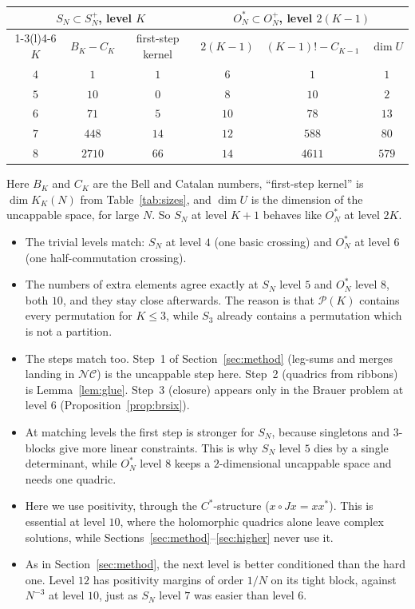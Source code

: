 \documentclass[11pt]{amsart}
\theoremstyle{definition}
\theoremstyle{remark}
\theoremstyle{plain}
\numberwithin{equation}{section}
\numberwithin{table}{section}
\begin{document}
\begin{center}
\begin{tabular}{@{}cccccc@{}}
\toprule
\multicolumn{3}{c}{$S_N\subset S_N^+$, level $K$} & \multicolumn{3}{c}{$O_N^*\subset O_N^+$, level $2(K-1)$}\\
\cmidrule(r){1-3}\cmidrule(l){4-6}
$K$ & $B_K-C_K$ & first-step kernel & $2(K-1)$ & $(K-1)!-C_{K-1}$ & $\dim U$ \\
\midrule
$4$ & $1$ & $1$ & $6$ & $1$ & $1$ \\
$5$ & $10$ & $0$ & $8$ & $10$ & $2$ \\
$6$ & $71$ & $5$ & $10$ & $78$ & $13$ \\
$7$ & $448$ & $14$ & $12$ & $588$ & $80$ \\
$8$ & $2710$ & $66$ & $14$ & $4611$ & $579$ \\
\bottomrule
\end{tabular}
\end{center}

Here $B_K$ and $C_K$ are the Bell and Catalan numbers, ``first-step kernel'' is $\dim K_K(N)$ from Table~\ref{tab:sizes}, and
$\dim U$ is the dimension of the uncappable space, for large $N$. So $S_N$ at level $K+1$ behaves like $O_N^*$ at level
$2K$.
\begin{itemize}
\item The trivial levels match: $S_N$ at level $4$ (one basic crossing) and $O_N^*$ at level $6$ (one half-commutation
crossing).
\item The numbers of extra elements agree exactly at $S_N$ level $5$ and $O_N^*$ level $8$, both $10$, and they stay close
afterwards. The reason is that $\mathcal P(K)$ contains every permutation for $K\le3$, while $S_3$ already contains a
permutation which is not a partition.
\item The steps match too. Step~1 of Section~\ref{sec:method} (leg-sums and merges landing in $\mathcal{NC}$) is the uncappable step
here. Step~2 (quadrics from ribbons) is Lemma~\ref{lem:glue}. Step~3 (closure) appears only in the Brauer problem at
level $6$ (Proposition~\ref{prop:brsix}).
\item At matching levels the first step is stronger for $S_N$, because singletons and $3$-blocks give more linear
constraints. This is why $S_N$ level $5$ dies by a single determinant, while $O_N^*$ level $8$ keeps a $2$-dimensional
uncappable space and needs one quadric.
\item Here we use positivity, through the $C^*$-structure ($x\circ Jx=xx^*$). This is essential at level $10$, where the
holomorphic quadrics alone leave complex solutions, while Sections~\ref{sec:method}--\ref{sec:higher} never use it.
\item As in Section~\ref{sec:method}, the next level is better conditioned than the hard one. Level $12$ has positivity margins of
order $1/N$ on its tight block, against $N^{-3}$ at level $10$, just as $S_N$ level $7$ was easier than level $6$.
\end{itemize}
\end{document}
